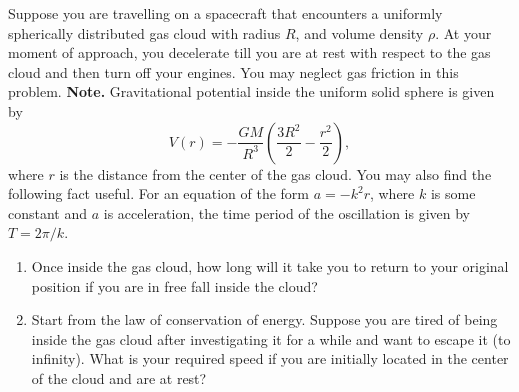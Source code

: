 Suppose you are travelling on a spacecraft that encounters a uniformly spherically distributed gas cloud with radius $R$, and volume density $\rho$. At your moment of approach, you decelerate till you are at rest with respect to the gas cloud and then turn off your engines. You may neglect gas friction in this problem.
\textbf{Note.} Gravitational potential inside the uniform solid sphere is given by
\[V(r)=-\frac{GM}{R^3}\left(\frac{3R^2}{2}-\frac{r^2}{2}\right),\]
where $r$ is the distance from the center of the gas cloud. You may also find the following fact useful. For an equation of the form $a=-k^2r$, where $k$ is some constant and $a$ is acceleration, the time period of the oscillation is given by $T=2\pi/k$.
\begin{enumerate}
\item Once inside the gas cloud, how long will it take you to return to your original position if you are in free fall inside the cloud?
\item Start from the law of conservation of energy. Suppose you are tired of being inside the gas cloud after investigating it for a while and want to escape it (to infinity). What is your required speed if you are initially located in the center of the cloud and are at rest?
\end{enumerate}
